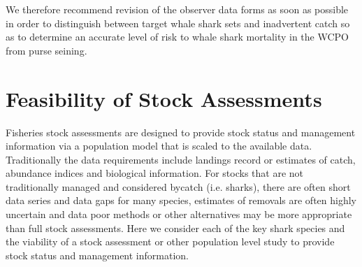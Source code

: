\documentclass[12pt]{SCreport}
\begin{document}
We therefore recommend revision of the observer data forms as soon as possible in order to distinguish between target whale shark sets and inadvertent catch so as to determine an accurate level of risk to whale shark mortality in the WCPO from purse seining.
  
  
  
      
\section{Feasibility of Stock Assessments}

Fisheries stock assessments are designed to provide stock status and management information via a population model that is scaled to the available data. Traditionally the data requirements include landings record or estimates of catch, abundance indices and biological information. For stocks that are not traditionally managed and considered bycatch (i.e. sharks), there are often short data series and data gaps for many species, estimates of removals are often highly uncertain and data poor methods or other alternatives may be more appropriate than full stock assessments. Here we consider each of the key shark species and the viability of a stock assessment or other population level study to provide stock status and management information.
\end{document}
